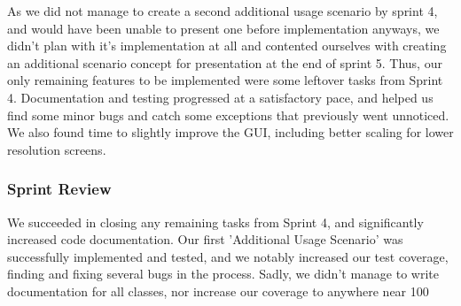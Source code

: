 As we did not manage to create a second additional usage scenario by sprint 4, and would have been unable to present one before implementation anyways, we didn't plan with it's implementation at all and contented ourselves with creating an additional scenario concept for presentation at the end of sprint 5. 
Thus, our only remaining features to be implemented were some leftover tasks from Sprint 4.
Documentation and testing progressed at a satisfactory pace, and helped us find some minor bugs and catch some exceptions that previously went unnoticed. We also found time to slightly improve the GUI, including better scaling for lower resolution screens.

\subsubsection*{Sprint Review}

We succeeded in closing any remaining tasks from Sprint 4, and significantly increased code documentation. 
Our first 'Additional Usage Scenario' was successfully implemented and tested, and we notably increased our test coverage, finding and fixing several bugs in the process. 
Sadly, we didn't manage to write documentation for all classes, nor increase our coverage to anywhere near 100%
